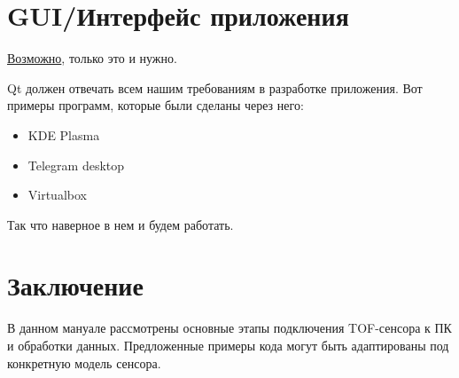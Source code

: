 \documentclass[12pt,a4paper]{article}
\begin{document}
\section{GUI/Интерфейс приложения}

\hyperlink{https://doc.qt.io/}{Возможно}, только это и нужно.

Qt должен отвечать всем нашим требованиям в разработке приложения. Вот примеры программ, которые были сделаны через него:

\begin{itemize}
    \item KDE Plasma
    \item Telegram desktop
    \item Virtualbox
\end{itemize}

Так что наверное в нем и будем работать.
\section{Заключение}
В данном мануале рассмотрены основные этапы подключения TOF-сенсора к ПК и обработки данных. Предложенные примеры кода могут быть адаптированы под конкретную модель сенсора.
\end{document}
